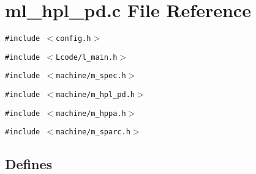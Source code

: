 \section{ml\_\-hpl\_\-pd.c File Reference}
\label{ml__hpl__pd_8c}
{\tt \#include $<$config.h$>$}\par
{\tt \#include $<$Lcode/l\_\-main.h$>$}\par
{\tt \#include $<$machine/m\_\-spec.h$>$}\par
{\tt \#include $<$machine/m\_\-hpl\_\-pd.h$>$}\par
{\tt \#include $<$machine/m\_\-hppa.h$>$}\par
{\tt \#include $<$machine/m\_\-sparc.h$>$}\par
\subsection*{Defines}
